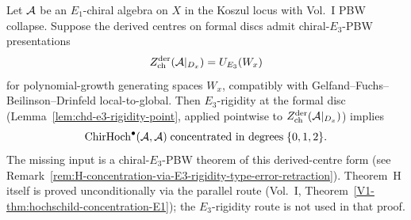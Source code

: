 \begin{conjecture}%
\label{conj:H-concentration-via-E3-rigidity}%
\label{thm:H-concentration-via-E3-rigidity}%
%
Let $\mathcal{A}$ be an $E_1$-chiral algebra on $X$ in the Koszul locus with
Vol.~I PBW collapse. Suppose the derived centres on formal discs admit
chiral-$E_3$-PBW presentations
\[
 Z^{\mathrm{der}}_{\mathrm{ch}}(\mathcal{A}|_{D_x}) = U_{E_3}(W_x)
\]
for polynomial-growth generating spaces $W_x$, compatibly with
Gelfand--Fuchs--Beilinson--Drinfeld local-to-global. Then
$E_3$-rigidity at the formal disc
(Lemma~\ref{lem:chd-e3-rigidity-point}, applied pointwise to
$Z^{\mathrm{der}}_{\mathrm{ch}}(\mathcal{A}|_{D_x})$) implies
\[
 \mathrm{ChirHoch}^\bullet(\mathcal{A}, \mathcal{A}) \;\text{concentrated in degrees}\; \{0, 1, 2\}.
\]
The missing input is a chiral-$E_3$-PBW theorem of this derived-centre
form (see
Remark~\ref{rem:H-concentration-via-E3-rigidity-type-error-retraction}).
Theorem~H itself is proved unconditionally via the parallel route
(Vol.~I, Theorem~\ref*{V1-thm:hochschild-concentration-E1}); the
$E_3$-rigidity route is not used in that proof.
\end{conjecture}

